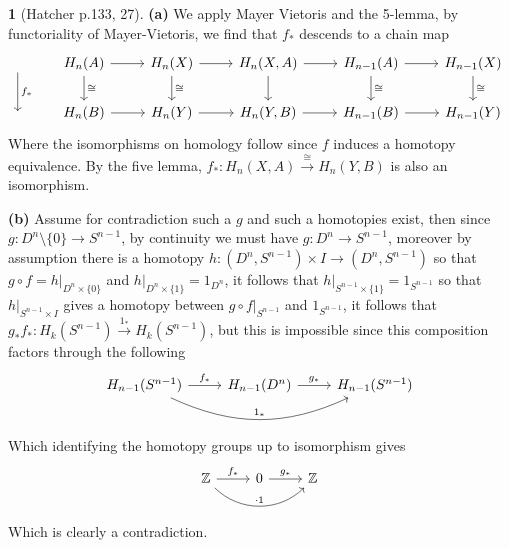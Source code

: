 \documentclass[10.5pt]{article}
\theoremstyle{definition}
\newtheorem{pb}{}
\newcommand{\set}[1]{\{#1\}}
\begin{document}
    \begin{pb}[Hatcher p.133, 27]
        \textbf{(a)} We apply Mayer Vietoris and the 5-lemma, by functoriality of Mayer-Vietoris, we find that \(f_*\) descends to a chain map
        \begin{equation*}
            \begin{tikzcd}
                {}\arrow[d,"f_*"] &H_n(A) \arrow{r}\arrow[d,"\cong"] &H_{n}(X) \arrow{r}\arrow[d,"\cong"] &H_n(X,A) \arrow{r}\arrow[d] & H_{n-1}(A)\arrow[d,"\cong"] \arrow{r} &H_{n-1}(X)\arrow[d,"\cong"] \\
                {} &H_n(B) \arrow{r} &H_n(Y) \arrow{r} &H_n(Y,B) \arrow{r} &H_{n-1}(B) \arrow{r} &H_{n-1}(Y)
            \end{tikzcd}
        \end{equation*}
        Where the isomorphisms on homology follow since \(f\) induces a homotopy equivalence. By the five lemma, \(f_* : H_n(X,A) \overset{\cong}{\longrightarrow} H_n(Y,B)\) is also an isomorphism.

        \textbf{(b)} Assume for contradiction such a \(g\) and such a homotopies exist, then since \(g: D^{n} \setminus \set{0} \to S^{n-1}\), by continuity we must have \(g: D^n \to S^{n-1}\), moreover by assumption there is a homotopy \(h: (D^n,S^{n-1}) \times I \to (D^n,S^{n-1})\) so that \(g \circ f = h\vert_{D^n \times \set{0}}\) and \(h\vert_{D^n\times\set{1}} = 1_{D^n}\), it follows that \(h\vert_{S^{n-1}\times \set{1}} = 1_{S^{n-1}}\) so that \(h\vert_{S^{n-1} \times I}\) gives a homotopy between \(g\circ f\vert_{S^{n-1}}\) and \(1_{S^{n-1}}\), it follows that \(g_*f_*: H_k(S^{n-1}) \overset{1_*}{\longrightarrow} H_k(S^{n-1})\), but this is impossible since this composition factors through the following
        \begin{equation*}
            \begin{tikzcd}
                H_{n-1}(S^{n-1}) \arrow[rr,bend right = 25,"1_*"] \arrow[r,"f_*"] &H_{n-1}(D^n) \arrow[r,"g_*"] &H_{n-1}(S^{n-1})
            \end{tikzcd}
        \end{equation*}
        Which identifying the homotopy groups up to isomorphism gives
        \begin{equation*}
            \begin{tikzcd}
                \mathbb{Z} \arrow[rr,bend right = 45,"\cdot1"] \arrow[r,"f_*"] &0 \arrow[r,"g_*"] &\mathbb{Z}
            \end{tikzcd}
        \end{equation*}
        Which is clearly a contradiction.
    \end{pb}
\end{document}

